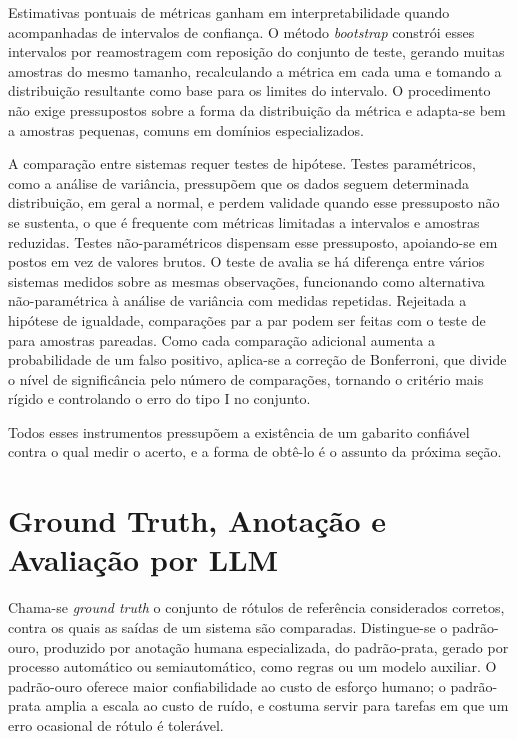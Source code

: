 Estimativas pontuais de métricas ganham em interpretabilidade quando acompanhadas de intervalos de confiança. O método \textit{bootstrap} constrói esses intervalos por reamostragem com reposição do conjunto de teste, gerando muitas amostras do mesmo tamanho, recalculando a métrica em cada uma e tomando a distribuição resultante como base para os limites do intervalo. O procedimento não exige pressupostos sobre a forma da distribuição da métrica e adapta-se bem a amostras pequenas, comuns em domínios especializados.

A comparação entre sistemas requer testes de hipótese. Testes paramétricos, como a análise de variância, pressupõem que os dados seguem determinada distribuição, em geral a normal, e perdem validade quando esse pressuposto não se sustenta, o que é frequente com métricas limitadas a intervalos e amostras reduzidas. Testes não-paramétricos dispensam esse pressuposto, apoiando-se em postos em vez de valores brutos. O teste de \citet{friedman1937} avalia se há diferença entre vários sistemas medidos sobre as mesmas observações, funcionando como alternativa não-paramétrica à análise de variância com medidas repetidas. Rejeitada a hipótese de igualdade, comparações par a par podem ser feitas com o teste de \citet{wilcoxon1945} para amostras pareadas. Como cada comparação adicional aumenta a probabilidade de um falso positivo, aplica-se a correção de Bonferroni, que divide o nível de significância pelo número de comparações, tornando o critério mais rígido e controlando o erro do tipo I no conjunto.

Todos esses instrumentos pressupõem a existência de um gabarito confiável contra o qual medir o acerto, e a forma de obtê-lo é o assunto da próxima seção.

\section{Ground Truth, Anotação e Avaliação por LLM}\label{sec:ground-truth}

Chama-se \textit{ground truth} o conjunto de rótulos de referência considerados corretos, contra os quais as saídas de um sistema são comparadas. Distingue-se o padrão-ouro, produzido por anotação humana especializada, do padrão-prata, gerado por processo automático ou semiautomático, como regras ou um modelo auxiliar. O padrão-ouro oferece maior confiabilidade ao custo de esforço humano; o padrão-prata amplia a escala ao custo de ruído, e costuma servir para tarefas em que um erro ocasional de rótulo é tolerável.

